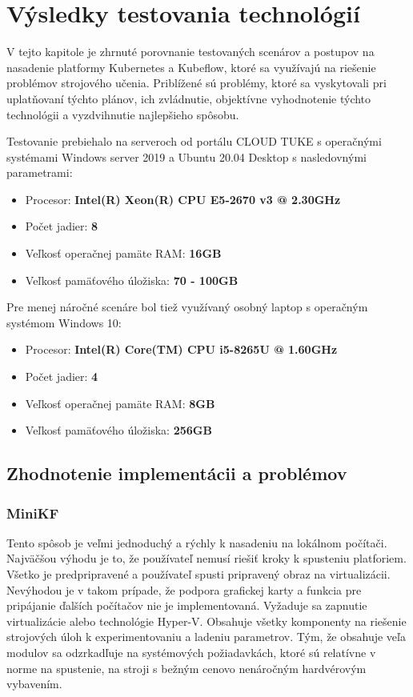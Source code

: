 
\chapter{Výsledky testovania technológií}
\label{evaluation}

V tejto kapitole je zhrnuté porovnanie testovaných scenárov a postupov na nasadenie platformy Kubernetes a Kubeflow, ktoré sa využívajú na riešenie problémov strojového učenia. Priblížené sú problémy, ktoré sa vyskytovali pri uplatňovaní týchto plánov, ich zvládnutie, objektívne vyhodnotenie týchto technológii a vyzdvihnutie najlepšieho spôsobu.

Testovanie prebiehalo na serveroch od portálu CLOUD TUKE s operačnými systémami Windows server 2019 a Ubuntu 20.04 Desktop s nasledovnými parametrami:

\begin{itemize}
	\item Procesor: \textbf{Intel(R) Xeon(R) CPU E5-2670 v3 @ 2.30GHz}
	\item Počet jadier: \textbf{8}
    \item Veľkosť operačnej pamäte RAM: \textbf{16GB}
    \item Veľkosť pamäťového úložiska: \textbf{70 - 100GB}
\end{itemize}

Pre menej náročné scenáre bol tiež využívaný osobný laptop s operačným systémom Windows 10:

\begin{itemize}
	\item Procesor: \textbf{Intel(R) Core(TM) CPU i5-8265U @ 1.60GHz}
	\item Počet jadier: \textbf{4}
    \item Veľkosť operačnej pamäte RAM: \textbf{8GB}
    \item Veľkosť pamäťového úložiska: \textbf{256GB}
\end{itemize}

\section{Zhodnotenie implementácii a problémov}

\subsection*{MiniKF}

Tento spôsob je veľmi jednoduchý a rýchly k nasadeniu na lokálnom počítači. Najväčšou výhodu je to, že používateľ nemusí riešiť kroky k spusteniu platforiem. Všetko je predpripravené a používateľ spusti pripravený obraz na virtualizácii. Nevýhodou je v takom prípade, že podpora grafickej karty a funkcia pre pripájanie ďalších počítačov nie je implementovaná. Vyžaduje sa zapnutie virtualizácie alebo technológie Hyper-V. Obsahuje všetky komponenty na riešenie strojových úloh k experimentovaniu a ladeniu parametrov. Tým, že obsahuje veľa modulov sa odzrkadľuje na systémových požiadavkách, ktoré sú relatívne v norme na spustenie, na stroji s bežným cenovo nenáročným hardvérovým vybavením.

